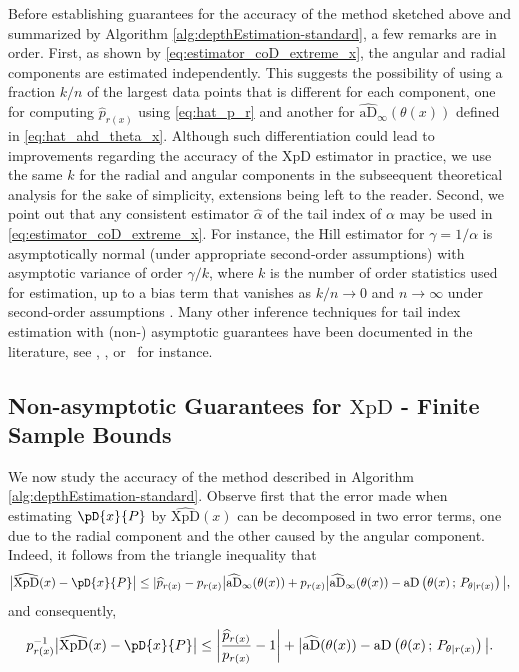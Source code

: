 \documentclass{article}
\numberwithin{equation}{section}
\newcommand{\XpDsymbol}{\mathrm{XpD}}  %
\newcommand{\XpD}{\ensuremath{\XpDsymbol}}
\newcommand{\coD}[2]{\pD{#1}{#2}}
\newcommand{\aD}[2]{{\mathrm{aD}}\left({#1}\,;\,{#2}\right)}
\begin{document}
Before establishing guarantees for the accuracy of the method
sketched above and summarized by Algorithm \ref{alg:depthEstimation-standard}, a few remarks are in
order. First, as shown by \eqref{eq:estimator_coD_extreme_x}, the
angular and radial components are estimated independently. This
suggests the possibility of using  a fraction $k/n$ of the largest
data points that is different for each component, one for computing
$\widehat{p}_{r(x)}$ using \eqref{eq:hat_p_r} and another for
$\widehat{\mathrm{aD}}_\infty(\theta(x))$ defined in \eqref{eq:hat_ahd_theta_x}.
Although such differentiation could lead to improvements regarding
the accuracy of the $\XpD$ estimator in practice, we use the same $k$
for the radial and angular components in the subseequent
theoretical analysis for the sake of simplicity, extensions being
left to the reader.
Second, we point out that any consistent estimator $\widehat{\alpha}$
of the tail index of $\alpha$ may be used in
\eqref{eq:estimator_coD_extreme_x}. For instance, the Hill estimator
for $\gamma= 1/\alpha$ is asymptotically normal (under
appropriate second-order assumptions) with asymptotic variance of
order $\gamma/k$, where $k$ is the number of order statistics
used for estimation, up to a bias term that vanishes as $k/n\to
0$ and  $n\to \infty$ under second-order assumptions
\citep{beirlant2006statistics}. Many other inference techniques for
tail index estimation with (non-) asymptotic guarantees have been
documented in the literature, see \cite{boucheron2015tail},
\cite{Carpentier2015}, \cite{bertail2025tail}
or~\cite{lederer2025adaptivetailindexestimation} for instance.

\subsection{Non-asymptotic Guarantees for $\XpD$ - Finite Sample
Bounds}\label{sec:tail-codepth-stats2}

We now study the accuracy of the method described in Algorithm
\ref{alg:depthEstimation-standard}. Observe first that the error made
when estimating \(\coD{x}{P}\) by $\widehat{\mathrm{XpD}}(x)$ can be decomposed
in two error terms, one due to the radial component and the other
caused by the angular component. Indeed, it follows from the
triangle
inequality that
\begin{equation*}
\big| \widehat{\mathrm{XpD}}(x) -\coD{x}{P}\big| \le
|\widehat p_{r(x)} -p_{r(x)}\big| \widehat{\mathrm{aD}}_\infty(\theta(x))+
p_{r(x)}\big| \widehat{\mathrm{aD}}_\infty(\theta(x)) - \aD{\theta(x)}{
P_{\theta|r(x)}} \big|,
\end{equation*}
and consequently,
\begin{equation}\label{eq:error_decomposxcod}
p_{r(x)}^{-1} \big| \widehat{\mathrm{XpD}}(x) -\coD{x}{P}\big| \le
\left|\frac{\widehat p_{r(x)}}{p_{r(x)}}-1\right| + \big|
\widehat{\mathrm{aD}}(\theta(x)) - \aD{\theta(x)}{
P_{\theta|r(x)}} \big|.
\end{equation}
\end{document}
